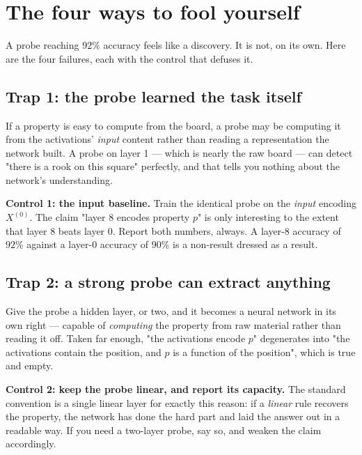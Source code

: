 \section{The four ways to fool yourself}

A probe reaching $92\%$ accuracy feels like a discovery. It is not, on its own. Here are the
four failures, each with the control that defuses it.

\subsection{Trap 1: the probe learned the task itself}

If a property is easy to compute from the board, a probe may be computing it from the
activations' \emph{input} content rather than reading a representation the network built.
A probe on layer 1 --- which is nearly the raw board --- can detect "there is a rook on this
square" perfectly, and that tells you nothing about the network's understanding.

\begin{keyidea}
\textbf{Control 1: the input baseline.} Train the identical probe on the \emph{input}
encoding $X^{(0)}$. The claim "layer 8 encodes property $p$" is only interesting to the extent
that layer 8 beats layer 0. Report both numbers, always. A layer-8 accuracy of $92\%$ against
a layer-0 accuracy of $90\%$ is a non-result dressed as a result.
\end{keyidea}

\subsection{Trap 2: a strong probe can extract anything}

Give the probe a hidden layer, or two, and it becomes a neural network in its own right ---
capable of \emph{computing} the property from raw material rather than reading it off. Taken
far enough, "the activations encode $p$" degenerates into "the activations contain the
position, and $p$ is a function of the position", which is true and empty.

\begin{keyidea}
\textbf{Control 2: keep the probe linear, and report its capacity.} The standard convention
is a single linear layer for exactly this reason: if a \emph{linear} rule recovers the
property, the network has done the hard part and laid the answer out in a readable way. If
you need a two-layer probe, say so, and weaken the claim accordingly.
\end{keyidea}

